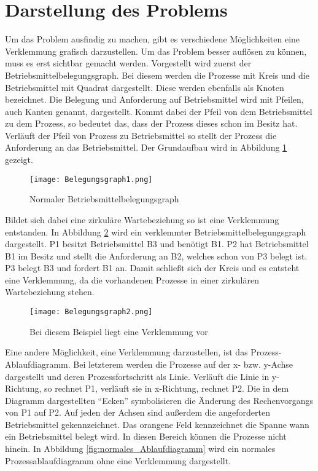 \section{Darstellung des Problems}
\label{problem}
Um das Problem ausfindig zu machen, gibt es verschiedene Möglichkeiten eine Verklemmung grafisch darzustellen. Um das Problem besser auflösen zu können, muss es erst sichtbar gemacht werden. Vorgestellt wird zuerst der Betriebsmittelbelegungsgraph. Bei diesem werden die Prozesse mit Kreis und die Betriebsmittel mit Quadrat dargestellt. Diese werden ebenfalls als Knoten bezeichnet. Die Belegung und Anforderung auf Betriebsmittel wird mit Pfeilen, auch Kanten genannt, dargestellt. Kommt dabei der Pfeil von dem Betriebsmittel zu dem Prozess, so bedeutet das, dass der Prozess dieses schon im Besitz hat. Verläuft der Pfeil von Prozess zu Betriebsmittel so stellt der Prozess die Anforderung an das Betriebsmittel. Der Grundaufbau wird in Abbildung \ref{fig:normaler_betriebsmittelbelegungsgraph} gezeigt.

\begin{figure}[h]
\caption{Normaler Betriebsmittelbelegungsgraph}
\label{fig:normaler_betriebsmittelbelegungsgraph}
\centering
\texttt{[image: Belegungsgraph1.png]}
\end{figure}

Bildet sich dabei eine zirkuläre Wartebeziehung so ist eine Verklemmung entstanden.  In Abbildung \ref{fig:verklemmter_betriebsmittelbelegungsgraph} wird ein verklemmter Betriebsmittelbelegungsgraph dargestellt.
P1 besitzt Betriebsmittel B3 und benötigt B1. P2 hat Betriebsmittel B1 im Besitz und stellt die Anforderung an B2, welches schon von P3 belegt ist. P3 belegt B3 und fordert B1 an. Damit schließt sich der Kreis und es entsteht eine Verklemmung, da die vorhandenen Prozesse in einer zirkulären Wartebeziehung stehen.

\begin{figure}[H]
\caption{Bei diesem Beispiel liegt eine Verklemmung vor}
\label{fig:verklemmter_betriebsmittelbelegungsgraph}
\centering
\texttt{[image: Belegungsgraph2.png]}
\end{figure}

Eine andere Möglichkeit, eine Verklemmung darzustellen, ist das Prozess-Ablaufdiagramm. Bei letzterem werden die Prozesse auf der x- bzw. y-Achse dargestellt und deren Prozessfortschritt als Linie. Verläuft die Linie in y-Richtung, so rechnet P1, verläuft sie in x-Richtung, rechnet P2. Die in dem Diagramm dargestellten ``Ecken'' symbolisieren die Änderung des Rechenvorgangs von P1 auf P2. Auf jeden der Achsen sind außerdem die angeforderten Betriebsmittel gekennzeichnet. Das orangene Feld kennzeichnet die Spanne wann ein Betriebsmittel belegt wird. In diesen Bereich können die Prozesse nicht hinein.
In Abbildung \ref{fig:normales_Ablaufdiagramm} wird ein normales Prozessablaufdiagramm ohne eine Verklemmung dargestellt.

